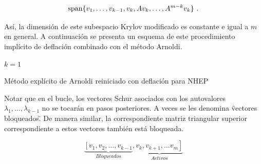\documentclass[a4paper,openright,12pt, oneside]{book}
\DeclarePairedDelimiter\norm{\lVert}{\rVert}
\begin{document}
\begin{displaymath}
\label{set:base}
{\rm span}\{ v_1,\ldots, v_{k-1} , v_k, A v_k, \ldots, A^{m-k} v_k \} \ .
\end{displaymath} 

As\'i, la dimensi\'on de este subespacio Krylov modificado es constante e igual a $ m $ en general. A continuaci\'on se presenta un esquema de este procedimiento impl\'icito de deflaci\'on combinado con el m\'etodo Arnoldi.


\begin{algorithm}
    \label{alg:ERAMDEF}

    $k = 1 $ \\
    
    \caption{M\'etodo expl\'icito de Arnoldi reiniciado con deflaci\'on para NHEP}
\end{algorithm}

Notar que en el bucle, los vectores Schur asociados con los autovalores $ \lambda_1, \ldots, \lambda_ {k-1} $ no se tocar\'an en pasos posteriores. A veces se les denomina \"vectores bloqueados\". De manera similar, la correspondiente matriz triangular superior correspondiente a estos vectores tambi\'en est\'a bloqueada.

\begin{displaymath}
\underbrace{\left[v_1, v_2, \ldots, v_{k-1}\right.}_{Bloqueados},
\underbrace{\left. v_k, v_{k+1}, \ldots v_m \right] }_{Activos}
\end{displaymath}
\end{document}
